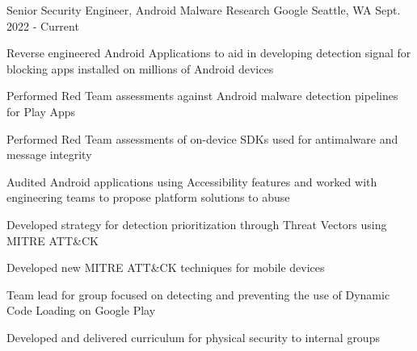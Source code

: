 


\begin{cventries}




\cventry
{Senior Security Engineer, Android Malware Research} %
{Google} %
{Seattle, WA} %
{Sept. 2022 - Current} %
{ %
\begin{cvitems}
    \item {Reverse engineered Android Applications to aid in developing detection signal for blocking apps installed on millions of Android devices}
    \item {Performed Red Team assessments against Android malware detection pipelines for Play Apps}
    \item {Performed Red Team assessments of on-device SDKs used for antimalware and message integrity}
    \item {Audited Android applications using Accessibility features and worked with engineering teams to propose platform solutions to abuse}
    \item {Developed strategy for detection prioritization through Threat Vectors using MITRE ATT&CK}
    \item {Developed new MITRE ATT&CK techniques for mobile devices}
    \item {Team lead for group focused on detecting and preventing the use of Dynamic Code Loading on Google Play}
    \item {Developed and delivered curriculum for physical security to internal groups}
\end{cvitems}
}


\end{cventries}

